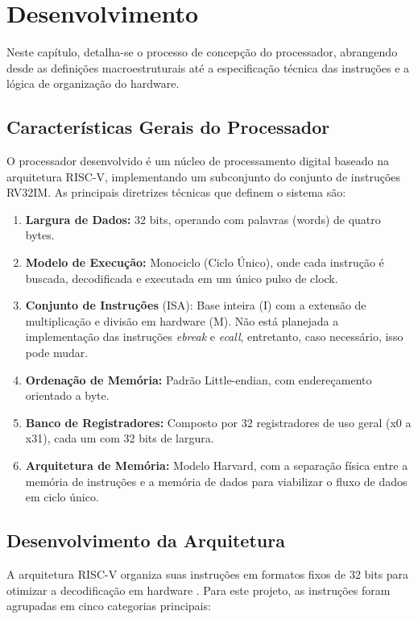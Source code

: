 \documentclass[
	12pt,				%
	oneside,
	a4paper,			%
	english,			%
	french,				%
	spanish,			%
	brazil,				%
	]{abntex2}
\begin{document}

\chapter{Desenvolvimento}

Neste capítulo, detalha-se o processo de concepção do processador, abrangendo desde as definições macroestruturais até a especificação técnica das instruções e a lógica de organização do hardware.

\section{Características Gerais do Processador}
O processador desenvolvido é um núcleo de processamento digital baseado na arquitetura RISC-V, implementando um subconjunto do conjunto de instruções RV32IM. As principais diretrizes técnicas que definem o sistema são:
\begin{enumerate}
    \item \textbf{Largura de Dados:} 32 bits, operando com palavras (words) de quatro bytes.
    \item \textbf{Modelo de Execução:} Monociclo (Ciclo Único), onde cada instrução é buscada, decodificada e executada em um único pulso de clock.
    \item \textbf{Conjunto de Instruções} (ISA): Base inteira (I) com a extensão de multiplicação e divisão em hardware (M). Não está planejada a implementação das instruções \textit{ebreak} e \textit{ecall}, entretanto, caso necessário, isso pode mudar.
    \item \textbf{Ordenação de Memória:} Padrão Little-endian, com endereçamento orientado a byte.
    \item \textbf{Banco de Registradores:} Composto por 32 registradores de uso geral (x0 a x31), cada um com 32 bits de largura.
    \item \textbf{Arquitetura de Memória:} Modelo Harvard, com a separação física entre a memória de instruções e a memória de dados para viabilizar o fluxo de dados em ciclo único.
\end{enumerate}



\section{Desenvolvimento da Arquitetura}
A arquitetura RISC-V organiza suas instruções em formatos fixos de 32 bits para otimizar a decodificação em hardware \cite{RISCVINTERNATIONAL}. Para este projeto, as instruções foram agrupadas em cinco categorias principais:
\end{document}
